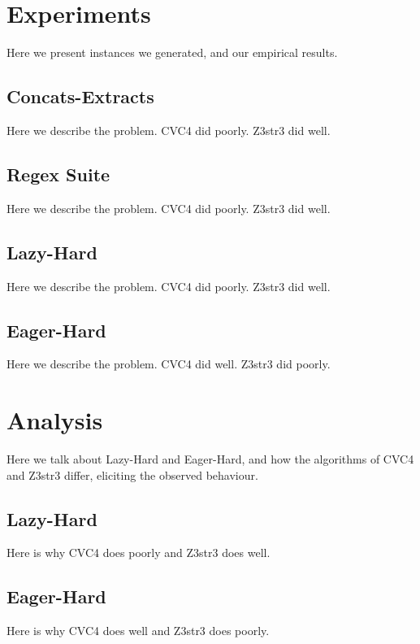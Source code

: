 \section{Experiments}

    Here we present instances we generated, and our empirical results.

    \subsection{Concats-Extracts}

        Here we describe the problem. CVC4 did poorly. Z3str3 did well.

    \subsection{Regex Suite}

        Here we describe the problem. CVC4 did poorly. Z3str3 did well.

    \subsection{Lazy-Hard}

        Here we describe the problem. CVC4 did poorly. Z3str3 did well.

    \subsection{Eager-Hard}

        Here we describe the problem. CVC4 did well. Z3str3 did poorly.

\section{Analysis}

    Here we talk about Lazy-Hard and Eager-Hard, and how the algorithms of CVC4 and Z3str3 differ, eliciting the observed behaviour.

    \subsection{Lazy-Hard}

        Here is why CVC4 does poorly and Z3str3 does well.

    \subsection{Eager-Hard}

        Here is why CVC4 does well and Z3str3 does poorly.
